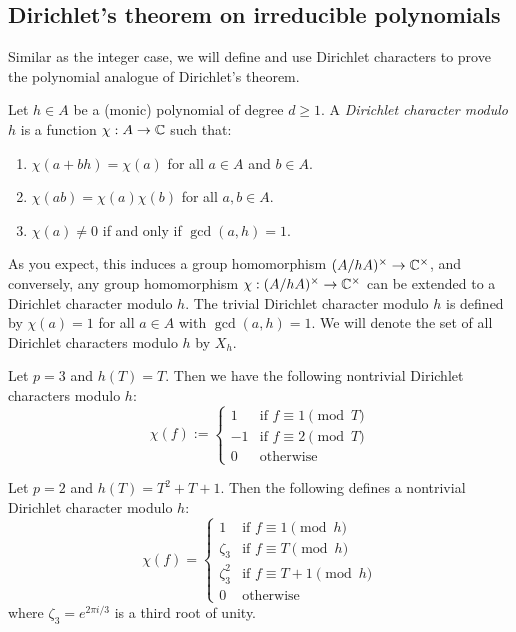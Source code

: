 \subsection{Dirichlet's theorem on irreducible polynomials}
\label{sec:dirichlet-polynomials}

Similar as the integer case, we will define and use Dirichlet characters to prove the polynomial analogue of Dirichlet's theorem.

\begin{definition}
    \label{def:dirichlet-character-poly}
    Let $h \in A$ be a (monic) polynomial of degree $d \geq 1$.
    A \emph{Dirichlet character modulo $h$} is a function $\chi: A \to \mathbb{C}$ such that:
    \begin{enumerate}
        \item $\chi(a + bh) = \chi(a)$ for all $a \in A$ and $b \in A$.
        \item $\chi(ab) = \chi(a)\chi(b)$ for all $a, b \in A$.
        \item $\chi(a) \ne 0$ if and only if $\gcd(a, h) = 1$.
    \end{enumerate}
\end{definition}

As you expect, this induces a group homomorphism $(A / hA)^\times \to \mathbb{C}^\times$, and conversely, any group homomorphism $\chi: (A / hA)^\times \to \mathbb{C}^\times$ can be extended to a Dirichlet character modulo $h$.
The trivial Dirichlet character modulo $h$ is defined by $\chi(a) = 1$ for all $a \in A$ with $\gcd(a, h) = 1$.
We will denote the set of all Dirichlet characters modulo $h$ by $X_h$.

\begin{example}
    \label{ex:dirichlet-character1}
    Let $p = 3$ and $h(T) = T$.
    Then we have the following nontrivial Dirichlet characters modulo $h$:    
    \[
    \chi(f) := \begin{cases}
        1 & \text{if } f \equiv 1 \pmod{T} \\
        -1 & \text{if } f \equiv 2 \pmod{T} \\
        0 & \text{otherwise}
    \end{cases}
    \]
\end{example}

\begin{example}
    \label{ex:dirichlet-character2}
    Let $p = 2$ and $h(T) = T^2 + T + 1$.
    Then the following defines a nontrivial Dirichlet character modulo $h$:
    \[
    \chi(f) = \begin{cases}
        1 & \text{if } f \equiv 1 \pmod{h} \\
        \zeta_3 & \text{if } f \equiv T \pmod{h} \\
        \zeta_3^2 & \text{if } f \equiv T + 1 \pmod{h} \\
        0 & \text{otherwise}
    \end{cases}
    \]
    where $\zeta_3 = e^{2\pi i / 3}$ is a third root of unity.
\end{example}

